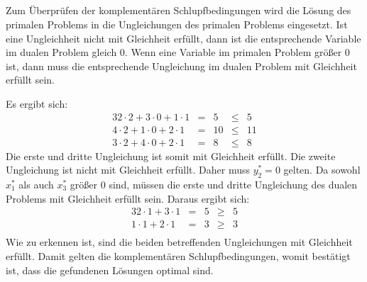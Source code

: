 \documentclass[10pt,a4paper,oneside,ngerman,numbers=noenddot]{scrartcl}
\begin{document}
	\subsection{} %
		Zum Überprüfen der komplementären Schlupfbedingungen wird die Lösung des primalen Problems in die Ungleichungen des primalen Problems eingesetzt. Ist eine Ungleichheit nicht mit Gleichheit erfüllt, dann ist die entsprechende Variable im dualen Problem gleich $0$. Wenn eine Variable im primalen Problem größer $0$ ist, dann muss die entsprechende Ungleichung im dualen Problem mit Gleichheit erfüllt sein.
		
		Es ergibt sich:
		\begin{alignat*}{3}
			2 \cdot 2 + 3 \cdot 0 + 1 \cdot 1 &=& 5 &\leq &5 \\
			4 \cdot 2 + 1 \cdot 0 + 2 \cdot 1 &=& 10 &\leq &11 \\
			3 \cdot 2 + 4 \cdot 0 + 2 \cdot 1 &=& 8 &\leq &8
		\end{alignat*}
		Die erste und dritte Ungleichung ist somit mit Gleichheit erfüllt. Die zweite Ungleichung ist nicht mit Gleichheit erfüllt. Daher muss $y_{2}^{*} = 0$ gelten. Da sowohl $x_{1}^{*}$ als auch $x_{3}^{*}$ größer $0$ sind, müssen die erste und dritte Ungleichung des dualen Problems mit Gleichheit erfüllt sein. Daraus ergibt sich:
		\begin{alignat*}{3}
			2 \cdot 1 + 3 \cdot 1 &=& 5 &\geq & 5\\
			1 \cdot 1 + 2 \cdot 1 &=& 3 &\geq & 3\\
		\end{alignat*}
		Wie zu erkennen ist, sind die beiden betreffenden Ungleichungen mit Gleichheit erfüllt. Damit gelten die komplementären Schlupfbedingungen, womit bestätigt ist, dass die gefundenen Lösungen optimal sind.
\section{} %
\end{document}
